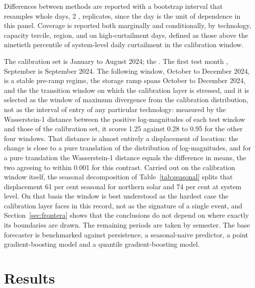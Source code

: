 \documentclass[preprint,3p,times]{elsarticle}
\providecommand{\DIFaddtex}[1]{{\protect\color{blue} \sf #1}} %
\providecommand{\DIFdeltex}[1]{{\protect\color{red} \scriptsize #1}} %
\providecommand{\DIFaddbegin}{} %
\providecommand{\DIFaddend}{} %
\providecommand{\DIFdelbegin}{} %
\providecommand{\DIFdelend}{} %
\providecommand{\DIFadd}[1]{\texorpdfstring{\DIFaddtex{#1}}{#1}} %
\providecommand{\DIFdel}[1]{\texorpdfstring{\DIFdeltex{#1}}{}} %
\begin{document}
\DIFadd{Differences between methods are reported with a bootstrap interval that resamples whole days, 2}{\DIFadd{,}}\DIFadd{000 replicates, since the day is the unit of dependence in this panel. Coverage is reported both marginally and conditionally, by technology, capacity tercile, region, and on high-curtailment days, defined as those above the ninetieth percentile of system-level daily curtailment in the calibration window.
}

\DIFaddend The calibration set is January to August \DIFdelbegin \DIFdel{2024; the }\DIFdelend \DIFaddbegin \DIFadd{2024. The }\DIFaddend first test month \DIFdelbegin \DIFdel{, September }\DIFdelend \DIFaddbegin \DIFadd{is September 2024. The following window, October to December }\DIFaddend 2024, is \DIFdelbegin \DIFdel{a stable pre-ramp regime, the storage ramp spans October to December 2024, and the }\DIFdelend \DIFaddbegin \DIFadd{the transition window on which the calibration layer is stressed, and it is selected as the window of maximum divergence from the calibration distribution, not as the interval of entry of any particular technology: measured by the Wasserstein-1 distance between the positive log-magnitudes of each test window and those of the calibration set, it scores 1.25 against 0.28 to 0.95 for the other four windows. That distance is almost entirely a displacement of location: the change is close to a pure translation of the distribution of log-magnitudes, and for a pure translation the Wasserstein-1 distance equals the difference in means, the two agreeing to within 0.001 for this contrast. Carried out on the calibration window itself, the seasonal decomposition of Table~\ref{tab:seasonal} splits that displacement 61 per cent seasonal for northern solar and 74 per cent at system level. On that basis the window is best understood as the hardest case the calibration layer faces in this record, not as the signature of a single event, and Section~\ref{sec:frontera} shows that the conclusions do not depend on where exactly its boundaries are drawn. The }\DIFaddend remaining periods are taken by semester. The base forecaster is benchmarked against persistence, a seasonal-naive predictor, a point gradient-boosting model and a quantile gradient-boosting model.

\section{Results}
\label{sec:results}
\end{document}

